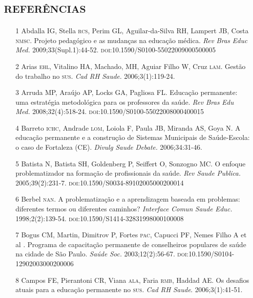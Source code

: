 \documentclass{article}
\begin{document}
\section*{\textsc{referências}}
\begin{itemize}

\item[1] Abdalla IG, Stella \textsc{rcs}, Perim GL, Aguilar-da-Silva RH, Lampert JB,
Costa \textsc{nmsc}. Projeto pedagógico e as mudanças na educação médica. \textit{Rev
Bras Educ Med.}
2009;33(Supl.1):44-52. \textsc{doi}:10.1590/S0100-55022009000500005

\item[2] Arias \textsc{ehl}, Vitalino HA, Machado, MH, Aguiar Filho W, Cruz \textsc{lam}. Gestão
do trabalho no \textsc{sus}. \textit{Cad RH Saude.}
2006;3(1):119-24.

\item[3] Arruda MP, Araújo AP, Locks GA, Pagliosa FL. Educação permanente: uma
estratégia metodológica para os professores da saúde. \textit{Rev Bras Edu Med.}
2008;32(4):518-24. \textsc{doi}:10.1590/S0100-55022008000400015

\item[4] Barreto \textsc{ichc}, Andrade \textsc{lom}, Loiola F, Paula JB, Miranda AS, Goya N. A
educação permanente e a construção de Sistemas Municipais de Saúde-Escola: o
caso de Fortaleza (CE). \textit{Divulg Saude Debate.}
2006;34:31-46.

\item[5] Batista N, Batista SH, Goldenberg P, Seiffert O, Sonzogno MC. O enfoque
problematizador na formação de profissionais da saúde. \textit{Rev Saude
Publica.}
2005;39(2):231-7. \textsc{doi}:10.1590/S0034-89102005000200014

\item[6] Berbel \textsc{nan}. A problematização e a aprendizagem baseada em problemas:
diferentes termos ou diferentes caminhos? \textit{Interface Comun Saude Educ.}
1998;2(2):139-54. \textsc{doi}:10.1590/S1414-32831998000100008

\item[7] Bogus CM, Martin, Dimitrov P, Fortes \textsc{pac}, Capucci PF, Nemes Filho A et
al \textit{.}
Programa de capacitação permanente de conselheiros populares de saúde na cidade
de São Paulo. \textit{Saúde Soc.}
2003;12(2):56-67. \textsc{doi}:10.1590/S0104-12902003000200006

\item[8] Campos FE, Pierantoni CR, Viana \textsc{ala}, Faria \textsc{rmb}, Haddad AE. Os desafios
atuais para a educação permanente no \textsc{sus}. \textit{Cad RH Saude}. 2006;3(1):41-51.


\end{itemize}
\end{document}
